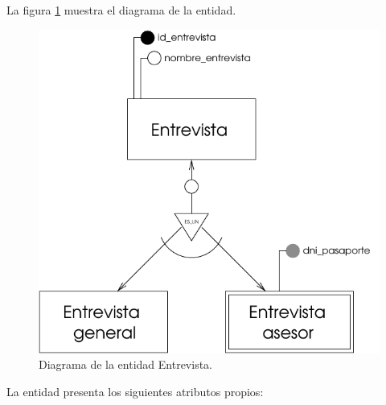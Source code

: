 \begin{description}
   \item[Diagrama] La figura \ref{diagramaEntrevista} muestra el diagrama de la entidad.
   \item \begin{figure}[!ht]
            \begin{center}
            \includegraphics[]{07.Modelo_Entidad-Interrelacion/7.2.Analisis_Entidades/diagramas/entrevista.pdf}
            \caption{Diagrama de la entidad Entrevista.}
            \label{diagramaEntrevista}
            \end{center}
         \end{figure}

   \item[Descripción de los atributos propios] La entidad presenta los
   siguientes atributos propios:


\end{description}
